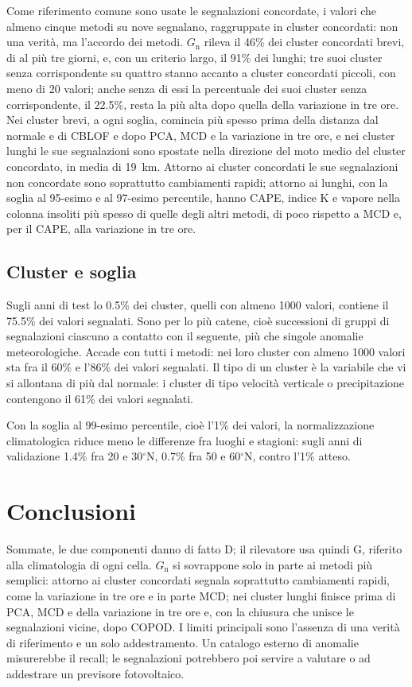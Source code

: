 \documentclass[11pt,a4paper]{article}
\begin{document}
Come riferimento comune sono usate le segnalazioni concordate, i valori che almeno cinque metodi su nove segnalano, raggruppate in cluster concordati: non una verità, ma l'accordo dei metodi. $G_{\mathrm{n}}$ rileva il 46\% dei cluster concordati brevi, di al più tre giorni, e, con un criterio largo, il 91\% dei lunghi; tre suoi cluster senza corrispondente su quattro stanno accanto a cluster concordati piccoli, con meno di 20 valori; anche senza di essi la percentuale dei suoi cluster senza corrispondente, il 22.5\%, resta la più alta dopo quella della variazione in tre ore. Nei cluster brevi, a ogni soglia, comincia più spesso prima della distanza dal normale e di CBLOF e dopo PCA, MCD e la variazione in tre ore, e nei cluster lunghi le sue segnalazioni sono spostate nella direzione del moto medio del cluster concordato, in media di 19~km. Attorno ai cluster concordati le sue segnalazioni non concordate sono soprattutto cambiamenti rapidi; attorno ai lunghi, con la soglia al 95-esimo e al 97-esimo percentile, hanno CAPE, indice K e vapore nella colonna insoliti più spesso di quelle degli altri metodi, di poco rispetto a MCD e, per il CAPE, alla variazione in tre ore.

\subsection{Cluster e soglia}

Sugli anni di test lo 0.5\% dei cluster, quelli con almeno 1000 valori, contiene il 75.5\% dei valori segnalati. Sono per lo più catene, cioè successioni di gruppi di segnalazioni ciascuno a contatto con il seguente, più che singole anomalie meteorologiche. Accade con tutti i metodi: nei loro cluster con almeno 1000 valori sta fra il 60\% e l'86\% dei valori segnalati. Il tipo di un cluster è la variabile che vi si allontana di più dal normale: i cluster di tipo velocità verticale o precipitazione contengono il 61\% dei valori segnalati.

Con la soglia al 99-esimo percentile, cioè l'1\% dei valori, la normalizzazione climatologica riduce meno le differenze fra luoghi e stagioni: sugli anni di validazione 1.4\% fra 20 e 30$^\circ$N, 0.7\% fra 50 e 60$^\circ$N, contro l'1\% atteso.

\section{Conclusioni}

Sommate, le due componenti danno di fatto D; il rilevatore usa quindi G, riferito alla climatologia di ogni cella. $G_{\mathrm{n}}$ si sovrappone solo in parte ai metodi più semplici: attorno ai cluster concordati segnala soprattutto cambiamenti rapidi, come la variazione in tre ore e in parte MCD; nei cluster lunghi finisce prima di PCA, MCD e della variazione in tre ore e, con la chiusura che unisce le segnalazioni vicine, dopo COPOD. I limiti principali sono l'assenza di una verità di riferimento e un solo addestramento. Un catalogo esterno di anomalie misurerebbe il recall; le segnalazioni potrebbero poi servire a valutare o ad addestrare un previsore fotovoltaico.
\end{document}
